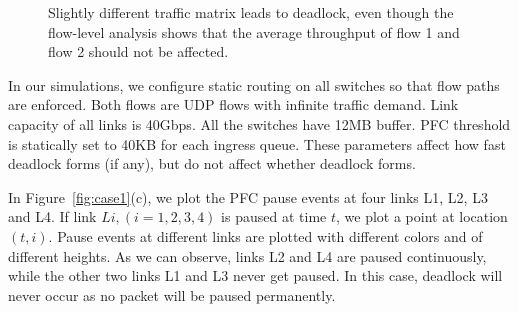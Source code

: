 \begin{figure}[t]
\centering

\vspace{-0.15in}
\caption{Slightly different traffic matrix leads to deadlock, even though
the flow-level analysis shows that the average throughput of flow 1 and flow 2 should not be affected.
}
\vspace{-0.15in}
\label{fig:case2}
\end{figure}

In our simulations, we configure static routing on all switches so that flow paths are enforced. 
Both flows are UDP flows with infinite traffic demand. Link capacity of 
all links is 40Gbps. All the switches have 12MB buffer. PFC threshold is statically set to 40KB for 
each ingress queue. These parameters affect how fast deadlock forms (if any), but do not affect whether deadlock forms.

In Figure~\ref{fig:case1}(c), we plot the PFC pause events at four links L1, L2, L3 and L4. 
If link $Li, (i=1,2,3,4)$ is paused at time $t$, we plot a point at location $(t, i)$. Pause events at 
different links are plotted with different colors and of different heights. As we can observe, links 
L2 and L4 are paused continuously, while the other two links L1 and L3 never get paused. In this case, 
deadlock will never occur as no packet will be paused permanently.

